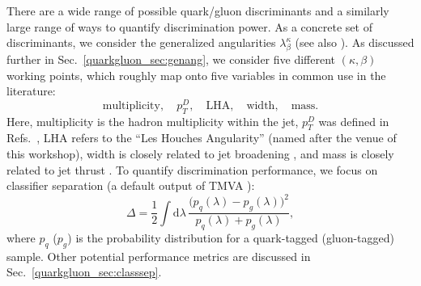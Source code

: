 \documentclass[11pt]{cernrep}
\begin{document}
There are a wide range of possible quark/gluon discriminants and a similarly large range of ways to quantify discrimination power.  As a concrete set of discriminants, we consider the generalized angularities $\lambda_\beta^\kappa$ \cite{Larkoski:2014pca} (see also \cite{Berger:2003iw,Almeida:2008yp,Ellis:2010rwa,Larkoski:2014uqa}).  As discussed further in Sec.~\ref{quarkgluon_sec:genang}, we consider five different $(\kappa, \beta)$ working points, which roughly map onto five variables in common use in the literature:
\begin{equation}
\text{multiplicity}, \quad p_T^D, \quad \text{LHA}, \quad \text{width} 
, \quad \text{mass} .
\end{equation}
Here, multiplicity is the hadron multiplicity within the jet, $p_T^D$ was defined in Refs.~\cite{Pandolfi:1480598,Chatrchyan:2012sn}, LHA refers to the ``Les Houches Angularity'' (named after the venue of this workshop), width is closely related to jet broadening \cite{Catani:1992jc,Rakow:1981qn,Ellis:1986ig}, and mass is closely related to jet thrust \cite{Farhi:1977sg}.  To quantify discrimination performance, we focus on classifier separation (a default output of TMVA \cite{2007physics...3039H}):
\begin{equation}
\Delta =  \frac{1}{2} \int \text{d} \lambda \, \frac{\bigl(p_q(\lambda) - p_g(\lambda)\bigr)^2}{p_q(\lambda) + p_g(\lambda)},
\end{equation}
where $p_q$ ($p_g$) is the probability distribution for a quark-tagged (gluon-tagged) sample.  Other potential performance metrics are discussed in Sec.~\ref{quarkgluon_sec:classsep}.
\end{document}
